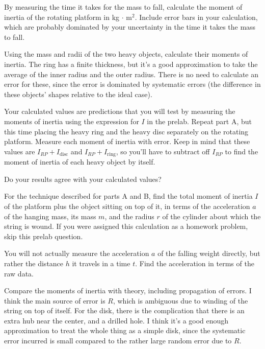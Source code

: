 By measuring the time it takes for the mass to fall, calculate the
moment of inertia of the rotating platform in kg$\,\cdot\,$m$^2$.
Include error bars in your calculation, which are probably dominated
by your uncertainty in the time it takes the mass to fall. 


Using the mass and radii of the two heavy objects, calculate their
moments of inertia. The ring has a finite thickness, but it's a good
approximation to take the average of the inner radius and the outer
radius. There is no need to calculate an error for these, since the
error is dominated by systematic errors (the difference in these
objects' shapes relative to the ideal case). 

Your calculated values are predictions that you will test by measuring
the moments of inertia using the expression for $I$ in the
prelab. Repeat part A, but this time placing the heavy ring and
the heavy disc separately on the rotating platform. Measure each
moment of inertia with error. Keep in mind that these values are
$I_{RP} + I_\text{disc}$ and $I_{RP} + I_\text{ring}$, so you'll have
to subtract off $I_{RP}$ to find the moment of inertia of each heavy
object by itself. 

Do your results agree with your calculated values?

\prelab

\prelabquestion For the technique described for parts A and B, 
find the total moment of inertia
$I$ of the platform plus the object sitting on top of it, in terms
of the acceleration $a$ of the hanging mass, its mass $m$, and the radius
$r$ of the cylinder about which the string is wound. If you were assigned
this calculation as a homework problem, skip this prelab question.

\prelabquestion You will not actually measure the acceleration $a$
of the falling weight directly, but rather the distance $h$ it travels
in a time $t$. Find the acceleration in terms of the raw data.

\analysis

Compare the moments of inertia with theory, including propagation of
errors. I think the main source of error is $R$, which is ambiguous due
to winding of the string on top of itself. For the disk, there is the
complication that there is an extra hub near the center, and a drilled
hole. I think it's a good enough approximation to treat the whole thing
as a simple disk, since the systematic error incurred is small compared
to the rather large random error due to $R$.

